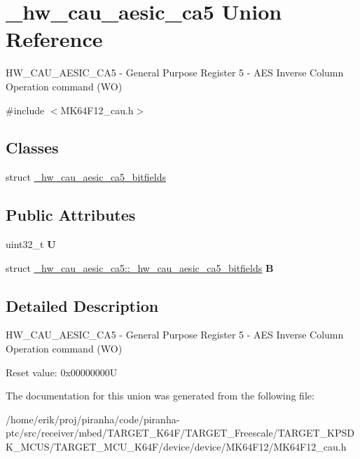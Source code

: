 \hypertarget{union__hw__cau__aesic__ca5}{}\section{\+\_\+hw\+\_\+cau\+\_\+aesic\+\_\+ca5 Union Reference}
\label{union__hw__cau__aesic__ca5}


H\+W\+\_\+\+C\+A\+U\+\_\+\+A\+E\+S\+I\+C\+\_\+\+C\+A5 -\/ General Purpose Register 5 -\/ A\+ES Inverse Column Operation command (WO)  




{\ttfamily \#include $<$M\+K64\+F12\+\_\+cau.\+h$>$}

\subsection*{Classes}
\begin{DoxyCompactItemize}
\item 
struct \hyperlink{struct__hw__cau__aesic__ca5_1_1__hw__cau__aesic__ca5__bitfields}{\+\_\+hw\+\_\+cau\+\_\+aesic\+\_\+ca5\+\_\+bitfields}
\end{DoxyCompactItemize}
\subsection*{Public Attributes}
\begin{DoxyCompactItemize}
\item 
uint32\+\_\+t {\bfseries U}\hypertarget{union__hw__cau__aesic__ca5_ac306e58048877807a7782189ce9f3680}{}\label{union__hw__cau__aesic__ca5_ac306e58048877807a7782189ce9f3680}

\item 
struct \hyperlink{struct__hw__cau__aesic__ca5_1_1__hw__cau__aesic__ca5__bitfields}{\+\_\+hw\+\_\+cau\+\_\+aesic\+\_\+ca5\+::\+\_\+hw\+\_\+cau\+\_\+aesic\+\_\+ca5\+\_\+bitfields} {\bfseries B}\hypertarget{union__hw__cau__aesic__ca5_aa143a72b1db02ba2d0791e5904558533}{}\label{union__hw__cau__aesic__ca5_aa143a72b1db02ba2d0791e5904558533}

\end{DoxyCompactItemize}


\subsection{Detailed Description}
H\+W\+\_\+\+C\+A\+U\+\_\+\+A\+E\+S\+I\+C\+\_\+\+C\+A5 -\/ General Purpose Register 5 -\/ A\+ES Inverse Column Operation command (WO) 

Reset value\+: 0x00000000U 

The documentation for this union was generated from the following file\+:\begin{DoxyCompactItemize}
\item 
/home/erik/proj/piranha/code/piranha-\/ptc/src/receiver/mbed/\+T\+A\+R\+G\+E\+T\+\_\+\+K64\+F/\+T\+A\+R\+G\+E\+T\+\_\+\+Freescale/\+T\+A\+R\+G\+E\+T\+\_\+\+K\+P\+S\+D\+K\+\_\+\+M\+C\+U\+S/\+T\+A\+R\+G\+E\+T\+\_\+\+M\+C\+U\+\_\+\+K64\+F/device/device/\+M\+K64\+F12/M\+K64\+F12\+\_\+cau.\+h\end{DoxyCompactItemize}
